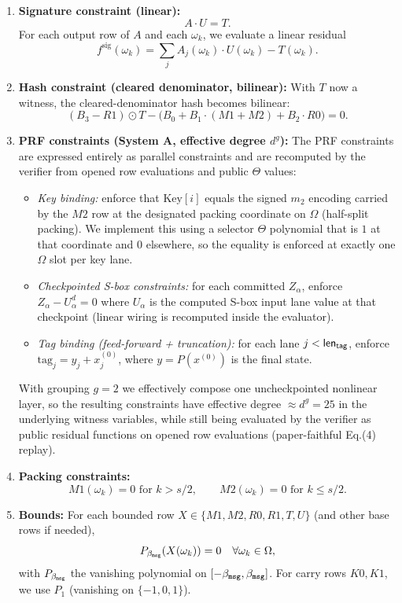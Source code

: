 \begin{enumerate}
  \item \textbf{Signature constraint (linear):}
  \[
  A\cdot U = T.
  \]
  For each output row of $A$ and each $\omega_k$, we evaluate a linear residual
  \[
  f^{\mathrm{sig}}(\omega_k)=\sum_j A_{j}(\omega_k)\cdot U(\omega_k)-T(\omega_k).
  \]

  \item \textbf{Hash constraint (cleared denominator, bilinear):}
  With $T$ now a witness, the cleared-denominator hash becomes bilinear:
  \[
  (B_3 - R1)\odot T - \big(B_0 + B_1\cdot(M1{+}M2) + B_2\cdot R0\big)=0.
  \]

  \item \textbf{PRF constraints (System A, effective degree $d^g$):}
  The PRF constraints are expressed entirely as parallel constraints and are recomputed by the verifier from opened row
  evaluations and public $\Theta$ values:
  \begin{itemize}
    \item \emph{Key binding:} enforce that $\mathrm{Key}[i]$ equals the signed $m_2$ encoding carried by the $M2$ row at the
    designated packing coordinate on $\Omega$ (half-split packing). We implement this using a selector $\Theta$ polynomial
    that is $1$ at that coordinate and $0$ elsewhere, so the equality is enforced at exactly one $\Omega$ slot per key lane.
    \item \emph{Checkpointed S-box constraints:} for each committed $Z_\alpha$, enforce $Z_\alpha - U_\alpha^d=0$ where
    $U_\alpha$ is the computed S-box input lane value at that checkpoint (linear wiring is recomputed inside the evaluator).
    \item \emph{Tag binding (feed-forward + truncation):} for each lane $j<\mathsf{len}_{\mathsf{tag}}$, enforce $\mathrm{tag}_j = y_j + x^{(0)}_j$,
    where $y=P(x^{(0)})$ is the final state.
  \end{itemize}
  With grouping $g=2$ we effectively compose one uncheckpointed nonlinear layer, so the resulting constraints have
  effective degree $\approx d^g=25$ in the underlying witness variables, while still being evaluated by the verifier as
  public residual functions on opened row evaluations (paper-faithful Eq.(4) replay).

  \item \textbf{Packing constraints:}
  \[
  M1(\omega_k)=0 \text{ for } k> s/2,\qquad M2(\omega_k)=0 \text{ for } k\le s/2.
  \]

  \item \textbf{Bounds:}
  For each bounded row $X\in\{M1,M2,R0,R1,T,U\}$ (and other base rows if needed),
  \[
  P_{\beta_{\mathtt{msg}}}(X(\omega_k))=0\quad\forall \omega_k\in\Omega,
  \]
  with $P_{\beta_{\mathtt{msg}}}$ the vanishing polynomial on $[-\beta_{\mathtt{msg}},\beta_{\mathtt{msg}}]$. For carry rows $K0,K1$, we use
  $P_1$ (vanishing on $\{-1,0,1\}$).
\end{enumerate}

